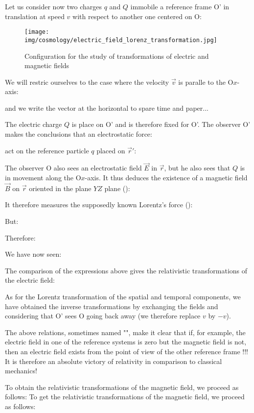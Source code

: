 	Let us consider now two charges $q$ and $Q$ immobile a reference frame O' in translation at speed $v$ with respect to another one centered on O:
	\begin{figure}[H]
		\centering
		\texttt{[image: img/cosmology/electric\_field\_lorenz\_transformation.jpg]}
		\caption{Configuration for the study of transformations of electric and magnetic fields}
	\end{figure}
	We will restric ourselves to the case where the velocity $\vec{v}$ is paralle to the O$x$-axis:
	
	and we write the vector at the horizontal to spare time and paper...

	The electric charge $Q$ is place on O' and is therefore fixed for O'. The observer O' makes the conclusions that an electrostatic force:
	
	act on the reference particle $q$ placed on $\vec{r}'$:
	
	The observer O also sees an electrostatic field $\vec{E}$ in $\vec{r}$, but he also sees that $Q$ is in movement along the O$x$-axis. It thus deduces the existence of a magnetic field $\vec{B}$ on $\vec{r}$ oriented in the plane $YZ$ plane ():
	
	It therefore measures the supposedly known Lorentz's force ():
	
	But:
	
	Therefore:
	
	We have now seen:
	
	The comparison of the expressions above gives the relativistic transformations of the electric field:
	
	As for the Lorentz transformation of the spatial and temporal components, we have obtained the inverse transformations by exchanging the fields and considering that O' sees O going back away (we therefore replace $v$ by $-v$).

	The above relations, sometimes named "", make it clear that if, for example, the electric field in one of the reference systems is zero but the magnetic field is not, then an electric field exists from the point of view of the other reference frame !!! It is therefore an absolute victory of relativity in comparison to classical mechanics!

	To obtain the relativistic transformations of the magnetic field, we proceed as follows:
	To get the relativistic transformations of the magnetic field, we proceed as follows:
	

